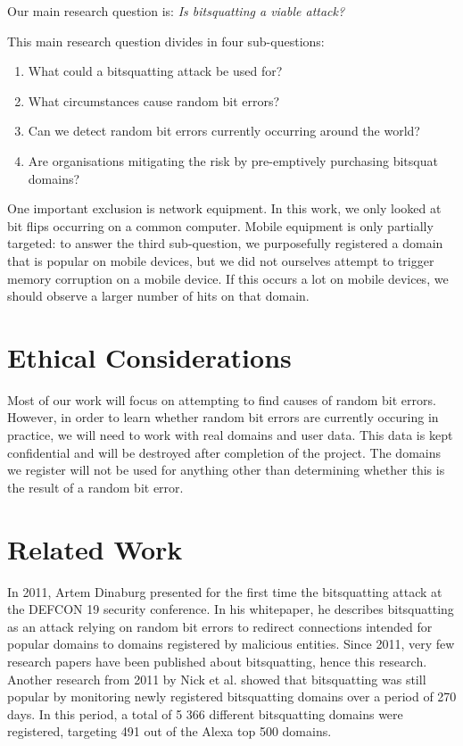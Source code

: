 \documentclass[conference]{IEEEtran}
\begin{document}
Our main research question is:
{\it Is bitsquatting a viable attack?}

\vspace{0.1cm}

\noindent{} This main research question divides in four sub-questions:

\begin{enumerate}
    \item What could a bitsquatting attack be used for?
	\item What circumstances cause random bit errors?
	\item Can we detect random bit errors currently occurring around the world?
	\item Are organisations mitigating the risk by pre-emptively purchasing
	      bitsquat domains?
\end{enumerate}

One important exclusion is network equipment. In this work, we only looked at
bit flips occurring on a common computer. Mobile equipment is only partially
targeted: to answer the third sub-question, we purposefully registered a domain
that is popular on mobile devices, but we did not ourselves attempt to trigger
memory corruption on a mobile device. If this occurs a lot on mobile devices,
we should observe a larger number of hits on that domain.


\section{Ethical Considerations}\label{sec:ethics}

Most of our work will focus on attempting to find causes of random bit errors.
However, in order to learn whether random bit errors are currently occuring in
practice, we will need to work with real domains and user data. This data is
kept confidential and will be destroyed after completion of the project. The
domains we register will not be used for anything other than determining
whether this is the result of a random bit error.


\section{Related Work}\label{sec:relwork}

In 2011, Artem Dinaburg presented for the first time the bitsquatting attack at
the DEFCON 19 security conference. In his
whitepaper\cite{dinaburg2011bitsquatting}, he describes bitsquatting as an
attack relying on random bit errors to redirect connections intended for
popular domains to domains registered by malicious entities. Since 2011, very
few research papers have been published about bitsquatting, hence this
research. Another research from 2011 by Nick et
al.\cite{nikiforakis2013bitsquatting} showed that bitsquatting was still
popular by monitoring newly registered bitsquatting domains over a period of
270 days. In this period, a total of 5 366 different bitsquatting domains were
registered, targeting 491 out of the Alexa top 500 domains.
\end{document}
